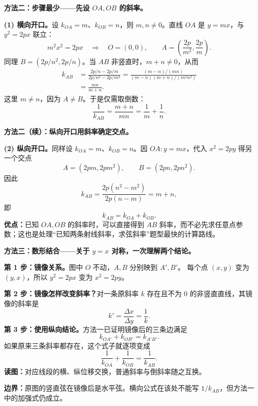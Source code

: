 \clearpage
\begin{proofbox}
\textbf{方法二：步骤最少——先设 $OA,OB$ 的斜率。}
\begin{center}\end{center}

\textbf{(1) 横向开口。}设 $k_{OA}=m$、$k_{OB}=n$，则 $m,n\ne0$。直线 $OA$ 是 $y=mx$，与 $y^2=2px$ 联立：
\[
m^2x^2=2px\quad\Longrightarrow\quad
O=(0,0),\qquad A=\left(\frac{2p}{m^2},\frac{2p}{m}\right).
\]
同理 $B=(2p/n^2,2p/n)$。当 $AB$ 非竖直时，$m+n\ne0$，从而
\[
\begin{aligned}
k_{AB}
&=\frac{2p/n-2p/m}{2p/n^2-2p/m^2}
 =\frac{(m-n)/(mn)}{(m-n)(m+n)/(m^2n^2)}\\
&=\frac{mn}{m+n}.
\end{aligned}
\]
这里 $m\ne n$，因为 $A\ne B$。于是仅需取倒数：
\[
\boxed{\frac1{k_{AB}}=\frac{m+n}{mn}=\frac1m+\frac1n}.
\]

\end{proofbox}
\clearpage
\begin{proofbox}
\textbf{方法二（续）：纵向开口用斜率确定交点。}
\begin{center}\end{center}
\textbf{(2) 纵向开口。}同样设 $k_{OA}=m$、$k_{OB}=n$。因 $OA:y=mx$，代入 $x^2=2py$ 得另一个交点
\[
A=(2pm,2pm^2),\qquad B=(2pn,2pn^2).
\]
因此
\[
k_{AB}=\frac{2p(n^2-m^2)}{2p(n-m)}=m+n,
\]
即
\[
\boxed{k_{AB}=k_{OA}+k_{OB}}.
\]
\textbf{优点：}已知 $OA,OB$ 的斜率时，可以直接得到 $AB$ 斜率，而不必先求任意点参数；这也是处理“已知两条射线斜率，求弦斜率”题型最快的计算路线。
\end{proofbox}

\clearpage
\begin{proofbox}
\textbf{方法三：数形结合——关于 $y=x$ 对称，一次理解两个结论。}
\begin{center}\end{center}

\textbf{第 1 步：镜像关系。}图中 $O$ 不动，$A,B$ 分别映到 $A',B'$。
每个点 $(x,y)$ 变为 $(y,x)$，所以 $y^2=2px$ 变为 $x^2=2py$。

\textbf{第 2 步：镜像怎样改变斜率？}对一条原斜率 $k$ 存在且不为 $0$ 的非竖直直线，其镜像的斜率是
\[
\boxed{k'=\frac{\Delta x}{\Delta y}=\frac1k}.
\]
\textbf{第 3 步：使用纵向结论。}方法一已证明镜像后的三条边满足
\[
k_{OA'}+k_{OB'}=k_{A'B'}.
\]
如果原来三条斜率都存在，这个式子就逐项变成
\[
\boxed{\frac1{k_{OA}}+\frac1{k_{OB}}=\frac1{k_{AB}}}.
\]
\textbf{读图：}对应线段的横、纵位移交换，普通斜率与倒斜率随之互换。

\textbf{边界：}原图的竖直弦在镜像后是水平弦。横向公式在该处不能写 $1/k_{AB}$，但方法一中的加强式仍成立。
\end{proofbox}

